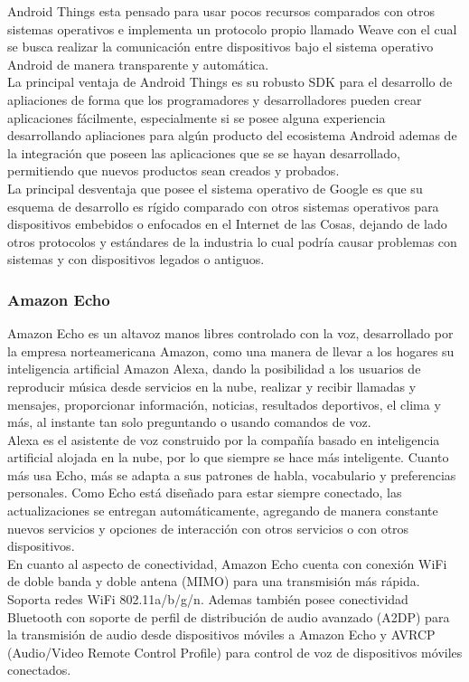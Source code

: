 Android Things esta pensado para usar pocos recursos comparados con otros sistemas operativos e implementa un protocolo propio llamado Weave con el cual se busca realizar la comunicación entre dispositivos bajo el sistema operativo Android de manera transparente y automática.\\

La principal ventaja de Android Things es su robusto SDK para el desarrollo de apliaciones de forma que los programadores y desarrolladores pueden crear aplicaciones fácilmente, especialmente si se posee alguna experiencia desarrollando apliaciones para algún producto del ecosistema Android ademas de la integración que poseen las aplicaciones que se se hayan desarrollado, permitiendo que nuevos productos sean creados y probados.\\

La principal desventaja que posee el sistema operativo de Google es que su esquema de desarrollo es rígido comparado con otros sistemas operativos para dispositivos embebidos o enfocados en el Internet de las Cosas, dejando de lado otros protocolos y estándares de la industria lo cual podría causar problemas con sistemas y con dispositivos legados o antiguos.

\subsubsection{Amazon Echo}
Amazon Echo es  un altavoz manos libres controlado con la voz, desarrollado por la empresa norteamericana Amazon, como una manera de llevar a los hogares su inteligencia artificial Amazon Alexa, dando la posibilidad a los usuarios de reproducir música desde servicios en la nube,  realizar y recibir llamadas y mensajes, proporcionar información, noticias, resultados deportivos, el clima y más, al instante tan solo preguntando o usando comandos de voz.\\

Alexa es el asistente de voz construido por la compañía basado en inteligencia artificial alojada en la nube, por lo que siempre se hace más inteligente. Cuanto más usa Echo, más se adapta a sus patrones de habla, vocabulario y preferencias personales. Como Echo está diseñado para estar siempre conectado, las actualizaciones se entregan automáticamente, agregando de manera constante nuevos servicios y opciones de interacción con otros servicios o con otros dispositivos.\\

En cuanto al aspecto de conectividad, Amazon Echo cuenta con conexión WiFi de doble banda y doble antena (MIMO) para una transmisión más rápida. Soporta redes WiFi 802.11a/b/g/n. Ademas también posee conectividad Bluetooth con soporte de perfil de distribución de audio avanzado (A2DP) para la transmisión de audio desde dispositivos móviles a Amazon Echo y AVRCP (Audio/Video Remote Control Profile) para control de voz de dispositivos móviles conectados.\cite{AmazonEcho}


